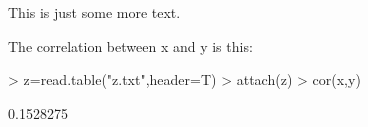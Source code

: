 This is just some more text.

The correlation between x and y is this:

\begin{Schunk}
\begin{Sinput}
> z=read.table("z.txt",header=T)
> attach(z)
> cor(x,y)
\end{Sinput}
\begin{Soutput}
[1] 0.1528275
\end{Soutput}
\end{Schunk}


